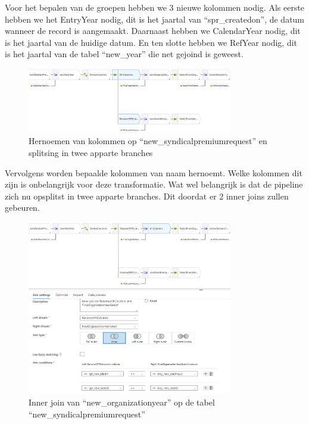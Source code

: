 Voor het bepalen van de groepen hebben we 3 nieuwe kolommen nodig. Als eerste hebben we het EntryYear nodig, dit is het jaartal van ``spr\_createdon'', de datum wanneer de record is aangemaakt. Daarnaast hebben we CalendarYear nodig, dit is het jaartal van de huidige datum. En ten slotte hebben we RefYear nodig, dit is het jaartal van de tabel ``new\_year'' die net gejoind is geweest.

\begin{figure}[H]
    \centering
    \includegraphics[width=0.8\textwidth]{./graphics/adf/bepalen_groep_3.png}
    \caption{Hernoemen van kolommen op ``new\_syndicalpremiumrequest'' en splitsing in twee apparte branches}
\end{figure}

Vervolgens worden bepaalde kolommen van naam hernoemt. Welke kolommen dit zijn is onbelangrijk voor deze transformatie. Wat wel belangrijk is dat de pipeline zich nu opsplitst in twee apparte branches. Dit doordat er 2 inner joins zullen gebeuren.

\begin{figure}[H]
    \centering
    \includegraphics[width=0.8\textwidth]{./graphics/adf/bepalen_groep_4.png}
    \caption{Inner join van ``new\_organizationyear'' op de tabel ``new\_syndicalpremiumrequest''}
\end{figure}

